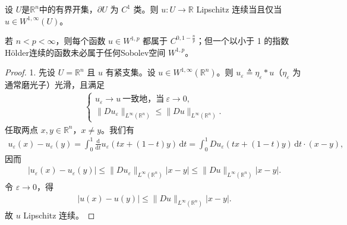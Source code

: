 \documentclass[../../main.tex]{subfiles}
\begin{document}
\begin{theorem}\label{theorem:ch05-W1infty刻画}
设 $U$是$\mathbb{R}^n$中的有界开集，$\partial U$ 为 $C^{1}$ 类。则 $u:U\to\mathbb{R}$ Lipschitz 连续当且仅当 $u\in W^{1,\infty}(U)$。
\end{theorem}
\begin{remark}
若 $n<p<\infty$，则每个函数 $u\in W^{1,p}$ 都属于 $C^{0,1-\frac{n}{p}}$；但一个以小于 1 的指数H\"older连续的函数未必属于任何Sobolev空间 $W^{1,p}$。
\end{remark}
\begin{proof}

1. 先设 $U=\mathbb{R}^{n}$ 且 $u$ 有紧支集。设 $u\in W^{1,\infty}(\mathbb{R}^{n})$。则 $u_{\varepsilon}\triangleq\eta_{\varepsilon}*u$（$\eta_{\varepsilon}$ 为通常磨光子）光滑，且满足
\begin{align*}
\begin{cases}
u_{\varepsilon}\to u\ \text{一致地，当}\ \varepsilon\to 0,\\
\|Du_{\varepsilon}\|_{L^{\infty}(\mathbb{R}^{n})}\leqslant\|Du\|_{L^{\infty}(\mathbb{R}^{n})}.
\end{cases}
\end{align*}
任取两点 $x,y\in\mathbb{R}^{n}$，$x\neq y$。我们有
\begin{align*}
u_{\varepsilon}(x)-u_{\varepsilon}(y)
=\int_{0}^{1}\frac{\mathrm{d}}{\mathrm{d}t}u_{\varepsilon}(tx+(1-t)y)\,\mathrm{d}t=\int_{0}^{1}Du_{\varepsilon}(tx+(1-t)y)\,\mathrm{d}t\cdot(x-y),
\end{align*}
因而
\begin{align*}
|u_{\varepsilon}(x)-u_{\varepsilon}(y)|
\leqslant\|Du_{\varepsilon}\|_{L^{\infty}(\mathbb{R}^{n})}|x-y|
\leqslant\|Du\|_{L^{\infty}(\mathbb{R}^{n})}|x-y|.
\end{align*}
令 $\varepsilon\to 0$，得
\begin{align*}
|u(x)-u(y)|\leqslant\|Du\|_{L^{\infty}(\mathbb{R}^{n})}|x-y|.
\end{align*}
故 $u$ Lipschitz 连续。


\end{proof}
\end{document}
